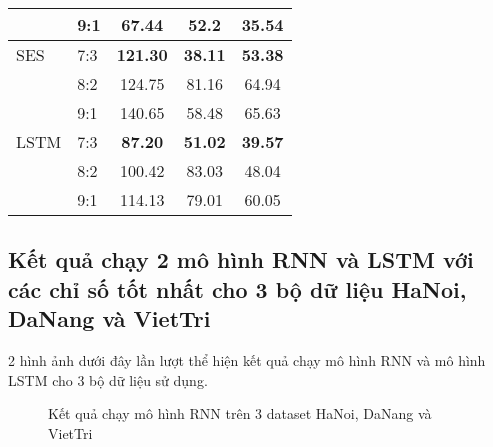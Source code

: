 \documentclass[conference]{IEEEtran}
\begin{document}
\begin{table}[H]
\begin{tabular}{|l|l|c|c|c|}
                               & 9:1                         & 67.44                     & 52.2                           & 35.54                    \\ \hline
        SES                    & 7:3                         & \textbf{121.30}           & \textbf{38.11}                 & \textbf{53.38}           \\ \cline{2-5}
                               & 8:2                         & 124.75                    & 81.16                          & 64.94                    \\ \cline{2-5}
                               & 9:1                         & 140.65                    & 58.48                          & 65.63                    \\ \hline
        LSTM                   & 7:3                         & \textbf{87.20}            & \textbf{51.02}                 & \textbf{39.57}           \\ \cline{2-5}
                               & 8:2                         & 100.42                    & 83.03                          & 48.04                    \\ \cline{2-5}
                               & 9:1                         & 114.13                    & 79.01                          & 60.05                    \\ \hline
    \end{tabular}
    \label{mbbresult}
\end{table}



\subsection{Kết quả chạy 2 mô hình RNN và LSTM với các chỉ số tốt nhất cho 3 bộ dữ liệu HaNoi, DaNang và VietTri}
2 hình ảnh dưới đây lần lượt thể hiện kết quả chạy mô hình RNN và mô hình LSTM cho 3 bộ dữ liệu sử dụng.
\begin{figure}[h]
    \centering
    \caption{Kết quả chạy mô hình RNN trên 3 dataset HaNoi, DaNang và VietTri}
\end{figure}
\end{document}
